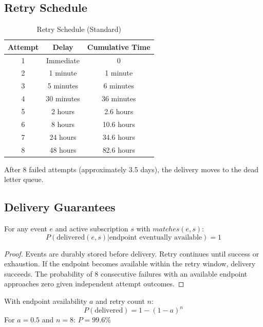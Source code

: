 \subsection{Retry Schedule}

\begin{table}[h]
\centering
\caption{Retry Schedule (Standard)}
\begin{tabular}{ccc}
\toprule
\textbf{Attempt} & \textbf{Delay} & \textbf{Cumulative Time} \\
\midrule
1 & Immediate & 0 \\
2 & 1 minute & 1 minute \\
3 & 5 minutes & 6 minutes \\
4 & 30 minutes & 36 minutes \\
5 & 2 hours & 2.6 hours \\
6 & 8 hours & 10.6 hours \\
7 & 24 hours & 34.6 hours \\
8 & 48 hours & 82.6 hours \\
\bottomrule
\end{tabular}
\end{table}

After 8 failed attempts (approximately 3.5 days), the delivery moves to the dead letter queue.

\subsection{Delivery Guarantees}

\begin{theorem}
For any event $e$ and active subscription $s$ with $matches(e, s)$:
\[
P(\text{delivered}(e, s) | \text{endpoint eventually available}) = 1
\]
\end{theorem}

\begin{proof}
Events are durably stored before delivery. Retry continues until success or exhaustion. If the endpoint becomes available within the retry window, delivery succeeds. The probability of 8 consecutive failures with an available endpoint approaches zero given independent attempt outcomes.
\end{proof}

\begin{theorem}
With endpoint availability $a$ and retry count $n$:
\begin{equation}
P(\text{delivered}) = 1 - (1-a)^n
\end{equation}
For $a = 0.5$ and $n = 8$: $P = 99.6\%$
\end{theorem}

